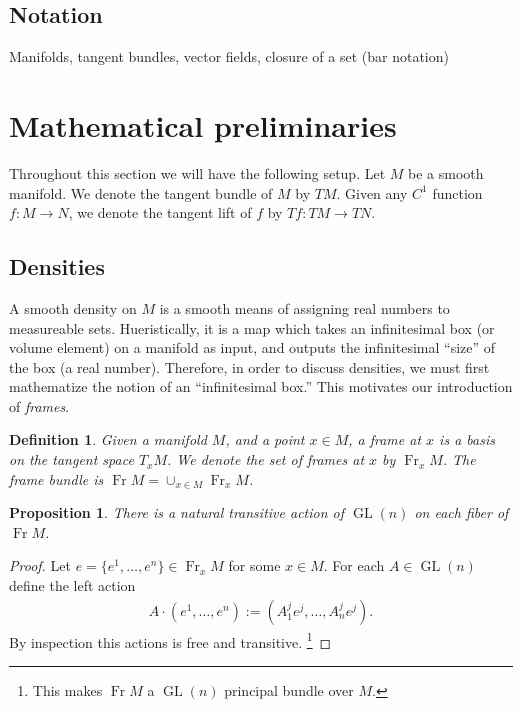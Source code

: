 \documentclass[letterpaper, 10 pt, conference]{ieeeconf}
\newtheorem{defn}[thm]{Definition}
\newtheorem{prop}[thm]{Proposition}
\DeclareMathOperator{\Fr}{Fr}
\DeclareMathOperator{\GL}{GL}
\begin{document}
\subsection{Notation}
  Manifolds, tangent bundles, vector fields, closure of a set (bar notation)

\section{Mathematical preliminaries}
\label{sec:math}
  Throughout this section we will have the following
  setup.  Let $M$ be a smooth manifold.
  We denote the tangent bundle of $M$ by $TM$.
  Given any $C^1$ function $f:M \to N$,
  we denote the tangent lift of $f$ by $Tf:TM \to TN$.

\subsection{Densities}
  A smooth density on $M$ is a smooth means of
  assigning real numbers to measureable sets.
  Hueristically, it is a map which
  takes an infinitesimal box (or volume element)
  on a manifold as input, and outputs the infinitesimal ``size''
  of the box (a real number).
  Therefore, in order to discuss densities,
  we must first mathematize the notion of an ``infinitesimal box.''
  This motivates our introduction of \emph{frames}.
  \begin{defn}
  \label{eq:frame_bundle}
    Given a manifold $M$, and a point $x \in M$,
    a \emph{frame at $x$} is a basis on the tangent space $T_x M$.
    We denote the set of frames at $x$ by $\Fr_x M$.
    The frame bundle is $\Fr M = \cup_{x \in M} \Fr_x M$.
  \end{defn}

  \begin{prop}
    There is a natural transitive
    action of $\GL(n)$ on each fiber of $\Fr M$.
  \end{prop}

  \begin{proof}
    Let $e = \{ e^1,\dots,e^n \} \in \Fr_x M$ for some $x \in M$.
    For each $A \in \GL(n)$ define the left action
    \begin{align*}
      A \cdot (e^1,\dots,e^n) := (A^j_1 e^j , \dots, A_n^j e^j ). 
    \end{align*}
    By inspection this actions is free and transitive.
    \footnote{This makes $\Fr M$ a $\GL(n)$ principal bundle over $M$.}
  \end{proof}
\end{document}
